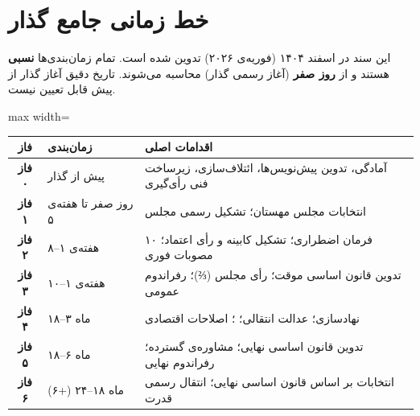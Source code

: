\documentclass[12pt,a4paper,twoside,openany]{book}
\begin{document}
	\chapter{خط زمانی جامع گذار}
	\label{ch:timeline}
	
	\begin{notebox}[title={\rl{یادداشت: زمان‌بندی نسبی}}]
		این سند در اسفند ۱۴۰۴ (فوریه‌ی ۲۰۲۶) تدوین شده است. تمام زمان‌بندی‌ها
		\textbf{نسبی} هستند و از \textbf{روز صفر} (آغاز رسمی گذار) محاسبه می‌شوند.
		تاریخ دقیق آغاز گذار از پیش قابل تعیین نیست.
	\end{notebox}
	
	\vspace{0.5\baselineskip}
	\noindent
	\begin{adjustbox}{max width=\linewidth}
		\begin{tabular}{@{}clp{8.5cm}@{}}
			\toprule
			\textbf{فاز} & \textbf{زمان‌بندی} & \textbf{اقدامات اصلی} \\
			\midrule
			\rowcolor{MahestanLightGray}
			\textbf{فاز ۰} & پیش از گذار &
			آمادگی، تدوین پیش‌نویس‌ها، ائتلاف‌سازی، زیرساخت فنی رأی‌گیری \\
			\rowcolor{WarningBg}
			\textbf{فاز ۱} & روز صفر تا هفته‌ی ۵ &
			انتخابات مجلس مهستان؛ تشکیل رسمی مجلس \\
			\rowcolor{DangerBg}
			\textbf{فاز ۲} & هفته‌ی ۱--۸ &
			۱۰ فرمان اضطراری؛ تشکیل کابینه و رأی اعتماد؛ مصوبات فوری \\
			\rowcolor{MahestanLightPurple!40}
			\textbf{فاز ۳} & هفته‌ی ۱--۱۰ &
			تدوین قانون اساسی موقت؛ رأی مجلس (⅔)؛ رفراندوم عمومی \\
			\rowcolor{NodeBg}
			\textbf{فاز ۴} & ماه ۳--۱۸ &
			نهادسازی؛ عدالت انتقالی؛ \lr{SSR}؛ اصلاحات اقتصادی \\
			\rowcolor{MahestanLightBlue!40}
			\textbf{فاز ۵} & ماه ۶--۱۸ &
			تدوین قانون اساسی نهایی؛ مشاوره‌ی گسترده؛ رفراندوم نهایی \\
			\rowcolor{SuccessBg}
			\textbf{فاز ۶} & ماه ۱۸--۲۴ (+۶) &
			انتخابات بر اساس قانون اساسی نهایی؛ انتقال رسمی قدرت \\
			\bottomrule
		\end{tabular}
	\end{adjustbox}
	
\end{document}
